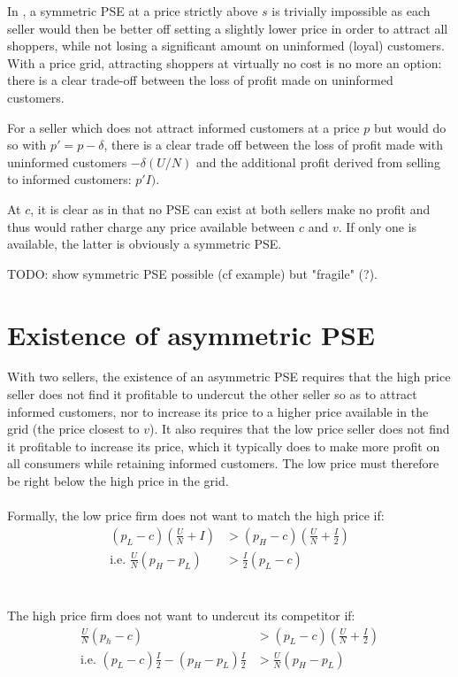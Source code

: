\documentclass[11pt]{article}
\begin{document}
In \cite{VAR80}, a symmetric PSE at a price strictly above $s$ is trivially impossible as each seller would then be better off setting a slightly lower price in order to attract all shoppers, while not losing a significant amount on uninformed (loyal) customers. With a price grid, attracting shoppers at virtually no cost is no more an option: there is a clear trade-off between the loss of profit made on uninformed customers.

For a seller which does not attract informed customers at a price $p$ but would do so with $p'=p-\delta$, there is a clear trade off between the loss of profit made with uninformed customers $-\delta(U/N)$ and the additional profit derived from selling to informed customers: $p' I)$.

At $c$, it is clear as in \cite{VAR80} that no PSE can exist at both sellers make no profit and thus would rather charge any price available between $c$ and $v$. If only one is available, the latter is obviously a symmetric PSE.

TODO: show symmetric PSE possible (cf example) but "fragile" (?).

\section{Existence of asymmetric PSE}

With two sellers, the existence of an asymmetric PSE requires that the high price seller does not find it profitable to undercut the other seller so as to attract informed customers, nor to increase its price to a higher price available in the grid (the price closest to $v$). It also requires that the low price seller does not find it profitable to increase its price, which it typically does to make more profit on all consumers while retaining informed customers. The low price must therefore be right below the high price in the grid.
\ \\
\ \\
Formally, the low price firm does not want to match the high price if:
\begin{align*}
(p_L - c)(\frac{U}{N} + I) & > (p_H - c)(\frac{U}{N} + \frac{I}{2}) \\
\text{i.e. } \frac{U}{N} (p_H - p_L) & > \frac{I}{2}(p_L - c)
\end{align*}
\ \\
\ \\
The high price firm does not want to undercut its competitor if:
\begin{align*}
\frac{U}{N}  (p_h - c) & > (p_L - c)(\frac{U}{N} + \frac{I}{2}) \\
\text{i.e. } (p_L - c) \frac{I}{2} - (p_H - p_L) \frac{I}{2} & > \frac{U}{N} (p_H - p_L)
\end{align*}
\newpage
\end{document}

